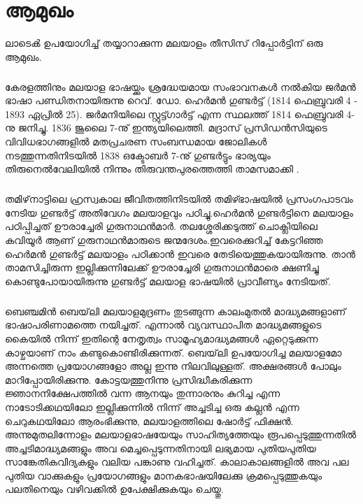  
\chapter{ആമുഖം}

ലാടെൿ ഉപയോഗിച്ച് തയ്യാറാക്കുന്ന മലയാളം തീസിസ് റിപ്പോർട്ടിന് ഒരു ആമുഖം.

\paragraph{}
 കേരളത്തിനും മലയാള ഭാഷയ്ക്കും ശ്രദ്ധേയമായ സംഭാവനകൾ നൽകിയ ജർമൻ ഭാഷാ പണ്ഡിതനായിരുന്നു റെവ്. ഡോ. ഹെർമൻ ഗുണ്ടർട്ട് (1814 ഫെബ്രുവരി 4 - 1893 ഏപ്രിൽ 25). ജർമനിയിലെ സ്റ്റുട്ട്ഗാർട്ട് എന്ന സ്ഥലത്ത് 1814 ഫെബ്രുവരി 4-നു ജനിച്ചു. 1836 ജൂലൈ 7-നു് ഇന്ത്യയിലെത്തി. മദ്രാസ് പ്രസിഡൻസിയുടെ വിവിധഭാഗങ്ങളിൽ മതപ്രചരണ സംബന്ധമായ ജോലികൾ നടത്തുന്നതിനിടയിൽ 1838 ഒക്ടോബർ 7-നു് ഗുണ്ടർട്ടും ഭാര്യയും തിരുനെൽവേലിയിൽ നിന്നും തിരുവന്തപുരത്തെത്തി താമസമാക്കി .

\paragraph{}
തമിഴ്‌നാട്ടിലെ ഹ്രസ്വകാല ജീവിതത്തിനിടയിൽ തമിഴ്ഭാഷയിൽ പ്രസംഗപാടവം നേടിയ ഗുണ്ടർട്ട് അതിവേഗം മലയാളവും പഠിച്ചു.ഹെർമൻ ഗുണ്ടർട്ടിനെ മലയാളം പഠിപ്പിച്ചത് ഊരാച്ചേരി ഗുരുനാഥൻമാർ. തലശ്ശേരിക്കടുത്ത് ചൊക്ലിയിലെ കവിയൂർ ആണ് ഗുരുനാഥൻമാരുടെ ജന്മദേശം.ഇവരെക്കുറിച്ച് കേട്ടറിഞ്ഞ ഹെർമൻ ഗുണ്ടർട്ട് മലയാളം പഠിക്കാൻ ഇവരെ തേടിയെത്തുകയായിരുന്നു. താൻ താമസിച്ചിരുന്ന ഇല്ലിക്കുന്നിലേക്ക് ഊരാച്ചേരി ഗുരുനാഥൻമാരെ ക്ഷണിച്ചു കൊണ്ടുപോയായിരുന്നു ഗുണ്ടർട്ട് മലയാള ഭാഷയിൽ പ്രാവീണ്യം നേടിയത്. 

\paragraph{}
ബെഞ്ചമിൻ ബെയ്‌ലി മലയാളമുദ്രണം തുടങ്ങുന്ന കാലംമുതൽ മാദ്ധ്യമങ്ങളാണ് ഭാഷാപരിണാമത്തെ നയിച്ചത്. എന്നാൽ വ്യവസ്ഥാപിത മാദ്ധ്യമങ്ങളുടെ കൈയിൽ നിന്ന് ഇതിന്റെ നേതൃത്വം സാമൂഹ്യമാദ്ധ്യമങ്ങൾ ഏറ്റെടുക്കുന്ന കാഴ്ചയാണ് നാം കണ്ടുകൊണ്ടിരിക്കുന്നത്. ബെയ്‌ലി ഉപയോഗിച്ച മലയാളമോ അന്നത്തെ പ്രയോഗങ്ങളോ അല്ല ഇന്നു നിലവിലുള്ളത്. അക്ഷരങ്ങൾ പോലും മാറിപ്പോയിരിക്കുന്നു. കോട്ടയത്തുനിന്നു പ്രസിദ്ധീകരിക്കുന്ന ജ്ഞാനനിക്ഷേപത്തിൽ വന്ന ആനയും തുന്നാരനും കുറിച്ച എന്ന നാടോടിക്കഥയിലോ ഇല്ലിക്കുന്നിൽ നിന്ന് അച്ചടിച്ച ഒരു കല്ലൻ എന്ന ചെറുകഥയിലോ ആരംഭിക്കുന്നു, മലയാളത്തിലെ ഷോർട്ട് ഫിക്ഷൻ. അന്നുമുതലിന്നോളം മലയാളഭാഷയേയും സാഹിത്യത്തേയും രൂപപ്പെടുത്തുന്നതിൽ അച്ചടിമാദ്ധ്യമങ്ങളും അവ മെച്ചപ്പെടുന്നതിനായി ലഭ്യമായ പുതിയപുതിയ സാങ്കേതികവിദ്യകളും വലിയ പങ്കാണു വഹിച്ചത്. കാലാകാലങ്ങളിൽ അവ പല പുതിയ വാക്കുകളും പ്രയോഗങ്ങളും മാനകഭാഷയിലേക്കു ക്രമപ്പെടുത്തുകയും പലതിനെയും വഴിവക്കിൽ ഉപേക്ഷിക്കുകയും ചെയ്തു\cite{bailey}. 